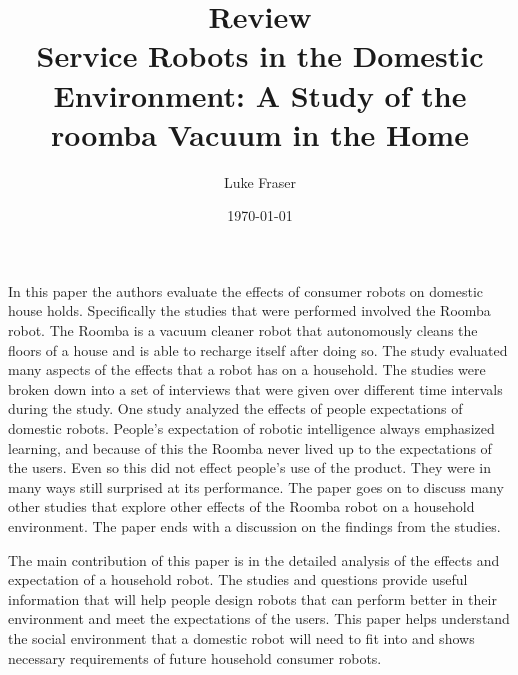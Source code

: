 \documentclass{article}
\begin{document}
\title{{\large Review} \\ Service Robots in the Domestic Environment: A Study of the roomba Vacuum in the Home}
\author{Luke Fraser}
\date{\today}
\maketitle

\begingroup
\renewcommand{\section}[2]{}


\endgroup

\section*{Summary}
In this paper the authors evaluate the effects of consumer robots on domestic house holds. Specifically the studies that were performed involved the Roomba robot. The Roomba is a vacuum cleaner robot that autonomously cleans the floors of a house and is able to recharge itself after doing so. The study evaluated many aspects of the effects that a robot has on a household. The studies were broken down into a set of interviews that were given over different time intervals during the study. One study analyzed the effects of people expectations of domestic robots. People's expectation of robotic intelligence always emphasized learning, and because of this the Roomba never lived up to the expectations of the users. Even so this did not effect people's use of the product. They were in many ways still surprised at its performance. The paper goes on to discuss many other studies that explore other effects of the Roomba robot on a household environment. The paper ends with a discussion on the findings from the studies.
\section*{Strengths}
The main contribution of this paper is in the detailed analysis of the effects and expectation of a household robot. The studies and questions provide useful information that will help people design robots that can perform better in their environment and meet the expectations of the users. This paper helps understand the social environment that a domestic robot will need to fit into and shows necessary requirements of future household consumer robots.
\end{document}
